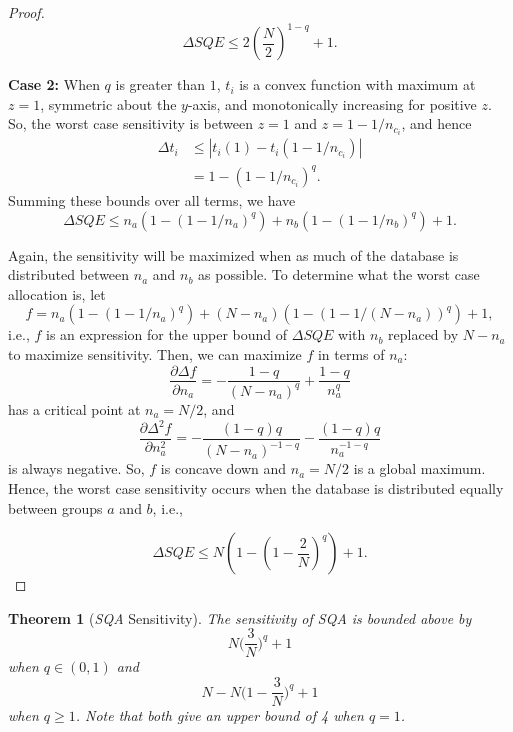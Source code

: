 \documentclass[USenglish,oneside]{article}
\newcounter{ab}
\newcounter{ar}
\newcounter{igh}
\newcounter{ms}
\newtheorem{theorem}{Theorem}
\newcommand{\dbsize}{\ensuremath{N}\xspace}
\newcommand{\sqa}{\textit{SQA}\xspace}
\newcommand{\sqe}{\textit{SQE}\xspace}
\begin{document}
\begin{proof}
$$\Delta \sqe \le 2\left(\frac{N}{2}\right)^{1-q} + 1.$$

\noindent\textbf{Case 2:}
When $q$ is greater than $1$, $t_{i}$ is a convex function with maximum at $z=1$, symmetric about the $y$-axis, and monotonically increasing for positive $z$. So, the worst case sensitivity is between $z=1$ and $z=1-1/n_{c_i}$, and hence 
%
\begin{align*}
\Delta t_{i} &\le \left\vert t_{i}(1) - t_{i}(1-1/n_{c_i}) \right\vert \\
	&= 1 - (1-1/n_{c_i})^q.
\end{align*}
%
Summing these bounds over all terms, we have 
%
$$ \Delta\sqe \le n_a(1-(1-1/n_a)^q) + n_b(1-(1-1/n_b)^q) + 1.$$

Again, the sensitivity will be maximized when as much of the database is distributed between $n_a$ and $n_b$ as possible. To determine what the worst case allocation is, let 
$$f = n_a(1-(1-1/n_a)^q) + (N-n_a)(1-(1-1/(N-n_a))^q) + 1,$$
i.e., $f$ is an expression for the upper bound of $\Delta\sqe$ with $n_b$ replaced by $N-n_a$ to maximize sensitivity. Then, we can maximize $f$ in terms of $n_a$:
$$ \frac{\partial \Delta f}{\partial n_a} =  -\frac{1-q}{(N - n_a)^q} + \frac{1-q}{n_a^q}$$
has a critical point at $n_a = N/2$, and 
$$ \frac{\partial \Delta^2 f}{\partial n_a^2} = - \frac{(1-q)q}{(N-n_a)^{-1-q}} - \frac{(1-q)q}{n_a^{-1-q}}$$
is always negative. So, $f$ is concave down and $n_a = N/2$ is a global maximum. Hence, the worst case sensitivity occurs when the database is distributed equally between groups $a$ and $b$, i.e.,

$$ \Delta\sqe \le N \left( 1- \left(1-\frac{2}{N}\right)^q \right) + 1.$$
\end{proof}

\setcounter{theorem}{7}
\begin{theorem}[\sqa Sensitivity] \label{thm:SQAsens-appendix} The sensitivity of \sqa is bounded above by 
\begin{equation*}
\dbsize\bigg(\frac{3}{\dbsize}\bigg)^q + 1
\end{equation*}
when $q \in (0,1)$ and
\begin{equation*}
\dbsize-\dbsize\bigg(1-\frac{3}{\dbsize}\bigg)^q + 1
\end{equation*}
when $q \geq 1$. Note that both give an upper bound of 4 when $q = 1$.
\end{theorem}
\end{document}
